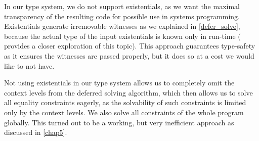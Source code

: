 In our type system, we do not support existentials, as we want the maximal transparency of the resulting code for possible use in systems programming. Existentials generate irremovable witnesses as we explained in \cref{defer_solve}, because the actual type of the input existentials is known only in run-time (\citet{grossman2002existential} provides a closer exploration of this topic). This approach guarantees type-safety as it ensures the witnesses are passed properly, but it does so at a cost we would like to not have.

Not using existentials in our type system allows us to completely omit the context levels from the deferred solving algorithm, which then allows us to solve all equality constraints eagerly, as the solvability of such constraints is limited only by the context levels. We also solve all constraints of the whole program globally. This turned out to be a working, but very inefficient approach as discussed in \cref{chap5}.
